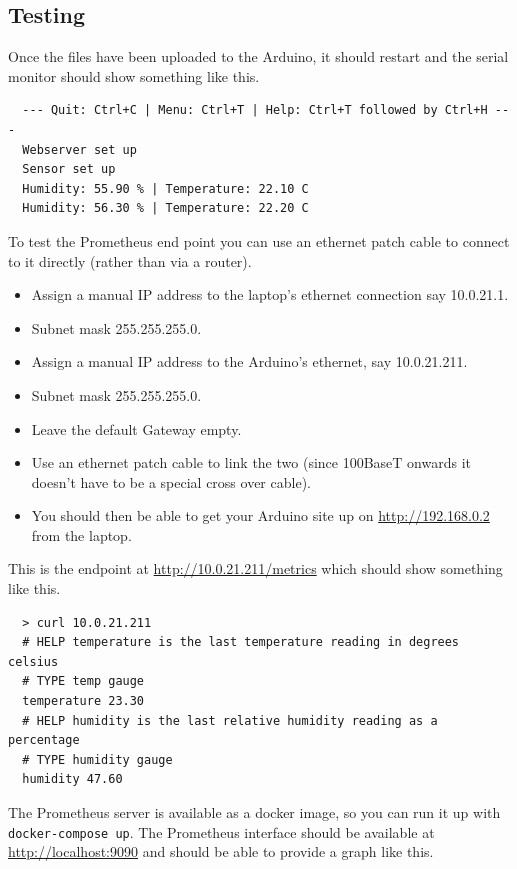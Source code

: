 \documentclass[a4paper, 11pt]{article}
\begin{document}
\subsection{Testing}

Once the files have been uploaded to the Arduino,
it should restart and the serial monitor should show something like this.

\begin{verbatim}
  --- Quit: Ctrl+C | Menu: Ctrl+T | Help: Ctrl+T followed by Ctrl+H ---
  Webserver set up
  Sensor set up
  Humidity: 55.90 % | Temperature: 22.10 C
  Humidity: 56.30 % | Temperature: 22.20 C
\end{verbatim}

To test the Prometheus end point you can use an ethernet patch cable to connect to it directly
(rather than via a router).

\begin{itemize}
  \item Assign a manual IP address to the laptop's ethernet connection say 10.0.21.1.
  \item Subnet mask 255.255.255.0.
  \item Assign a manual IP address to the Arduino's ethernet, say 10.0.21.211.
  \item Subnet mask 255.255.255.0.
  \item Leave the default Gateway empty.
  \item Use an ethernet patch cable to link the two (since 100BaseT onwards it doesn't have to be a special cross over cable).
  \item You should then be able to get your Arduino site up on \url{http://192.168.0.2} from the laptop.
\end{itemize}
  
This is the endpoint at \url{http://10.0.21.211/metrics} which should show something like this.
  
\begin{verbatim}
  > curl 10.0.21.211
  # HELP temperature is the last temperature reading in degrees celsius
  # TYPE temp gauge
  temperature 23.30
  # HELP humidity is the last relative humidity reading as a percentage
  # TYPE humidity gauge
  humidity 47.60
\end{verbatim}

The Prometheus server is available as a docker image,
so you can run it up with \verb|docker-compose up|.
The Prometheus interface should be available at \url{http://localhost:9090}
and should be able to provide a graph like this.
\end{document}
